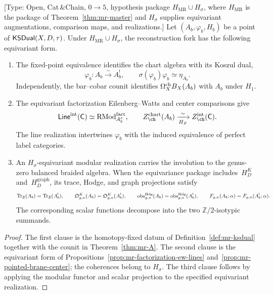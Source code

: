 \begin{theorem}
\label{thm:mr-ksdual}
\textup{[Type: Open, Cat$\,\&$Chain, $0\rightarrow 5$, hypothesis
package $H_{\mathrm{MR}}\cup H_\sigma$, where $H_{\mathrm{MR}}$ is the
package of Theorem~\ref{thm:mr-master} and $H_\sigma$ supplies
equivariant augmentations, comparison maps, and realizations.]}
Let $(A_b,\varphi_b,H_b)$ be a point of
$\mathsf{KSDual}(X,D,\tau)$.  Under $H_{\mathrm{MR}}\cup H_\sigma$, the
reconstruction fork has the following equivariant form.
\begin{enumerate}[label=\textup{(\roman*)}]
\item The fixed-point equivalence identifies the chart algebra with
its Koszul dual,
\[
 \varphi_b\colon A_b\xrightarrow{\sim}A_b^!,
 \qquad
 \sigma(\varphi_b)\varphi_b\simeq\eta_{A_b}.
\]
Independently, the bar--cobar counit identifies
$\Omega^{\mathrm{ch}}_XB_X(A_b)$ with $A_b$ under $H_1$.
\item The equivariant factorization Eilenberg--Watts and center
comparisons give
\[
 \mathsf{Line}^{\mathrm{int}}(\mathsf C)
 \simeq\mathrm{RMod}^{\fact}_{A_b^e},
 \qquad
 Z_{\ch}^{\mathrm{chart}}(A_b)
 \xrightarrow[H_Z]{\sim}Z_{\ch}^{\mathrm{int}}(\mathsf C).
\]
The line realization intertwines $\varphi_b$ with the induced
equivalence of perfect label categories.
\item An $H_\sigma$-equivariant modular realization carries the
involution to the genus-zero balanced braided algebra.  When the
equivariance package includes~$H_D^K$ and~$H_D^{\mathrm{graph}}$, its
trace, Hodge, and graph projections satisfy
\[
 \mathrm{Tr}_{\mathfrak F}(A_b)=\mathrm{Tr}_{\mathfrak F}(A_b^!),
 \qquad
 \mathfrak O^K_{g,n}(A_b)=\mathfrak O^K_{g,n}(A_b^!),
 \qquad
 \operatorname{obs}^{\mathrm{Hdg}}_{g,n}(A_b)
 =\operatorname{obs}^{\mathrm{Hdg}}_{g,n}(A_b^!),
 \qquad
 F_{g,n}(A_b;\alpha)=F_{g,n}(A_b^!;\alpha).
\]
The corresponding scalar functions decompose into the two
$\mathbb Z/2$-isotypic summands.
\end{enumerate}
\end{theorem}

\begin{proof}
The first clause is the homotopy-fixed datum of
Definition~\ref{def:mr-ksdual} together with the counit in
Theorem~\ref{thm:mr-A}.  The second clause is the equivariant form of
Propositions~\ref{prop:mr-factorization-ew-lines}
and~\ref{prop:mr-pointed-brane-center}; the coherences belong to
$H_\sigma$.  The third clause follows by applying the modular functor
and scalar projection to the specified equivariant realization.
\end{proof}

